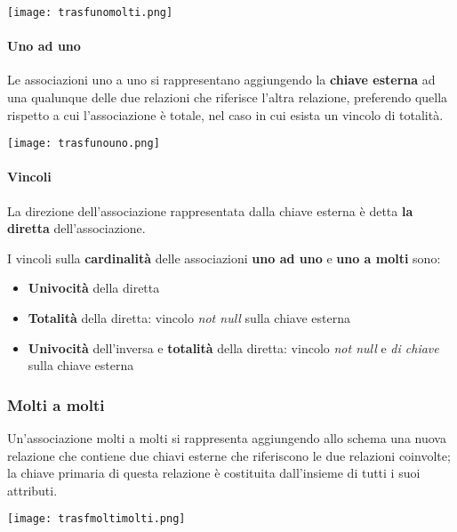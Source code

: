 \begin{center}
	\texttt{[image: trasfunomolti.png]}
\end{center}

\paragraph{Uno ad uno}
Le associazioni uno a uno si rappresentano aggiungendo la \textbf{chiave esterna} ad una qualunque delle due relazioni che riferisce l’altra relazione, preferendo quella rispetto a cui l’associazione è totale, nel caso in cui esista un vincolo di totalità.
\begin{center}
	\texttt{[image: trasfunouno.png]}
\end{center}

\paragraph{Vincoli}
\begin{definition}[Diretta]
	La direzione dell’associazione rappresentata dalla chiave esterna è	detta \textbf{la diretta} dell’associazione.
\end{definition}

I vincoli sulla \textbf{cardinalità} delle associazioni \textbf{uno ad uno} e \textbf{uno a molti} sono:
\begin{itemize}
	\item \textbf{Univocità} della diretta
	\item \textbf{Totalità} della diretta: vincolo \textit{not null} sulla chiave esterna
	\item \textbf{Univocità} dell'inversa e \textbf{totalità} della diretta: vincolo \textit{not null} e \textit{di chiave} sulla chiave esterna
\end{itemize}
\subsubsection{Molti a molti}
Un’associazione molti a molti si rappresenta aggiungendo allo schema una nuova relazione che contiene due chiavi esterne che riferiscono le due relazioni coinvolte; la chiave primaria di questa relazione è costituita dall’insieme di tutti i suoi attributi.

\begin{center}
	\texttt{[image: trasfmoltimolti.png]}
\end{center}


